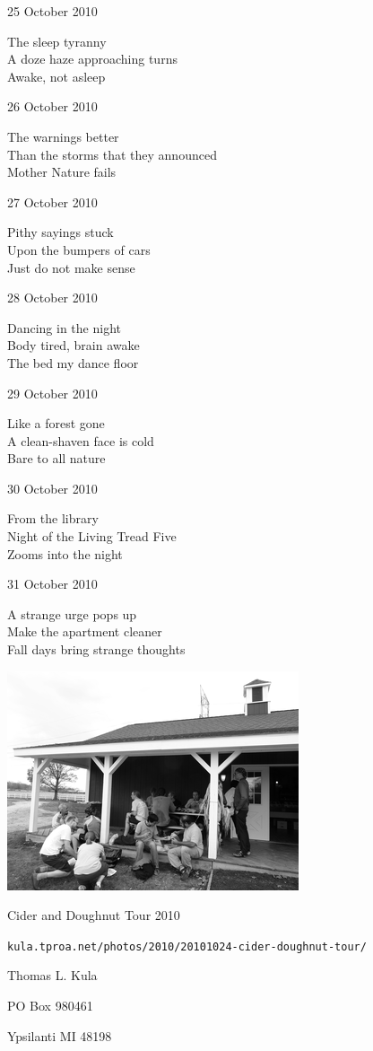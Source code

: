 \documentclass[12pt]{article}
\begin{document}
\newpage

25 October 2010

The sleep tyranny \\
A doze haze approaching turns \\
Awake, not asleep

26 October 2010

The warnings better \\
Than the storms that they announced \\
Mother Nature fails

27 October 2010

Pithy sayings stuck \\
Upon the bumpers of cars \\
Just do not make sense

28 October 2010

Dancing in the night \\
Body tired, brain awake \\
The bed my dance floor

29 October 2010

Like a forest gone \\
A clean-shaven face is cold \\
Bare to all nature

30 October 2010

From the library \\
Night of the Living Tread Five \\
Zooms into the night

31 October 2010

A strange urge pops up \\
Make the apartment cleaner \\
Fall days bring strange thoughts


\newpage

\begin{center}
\includegraphics{cider-and-doughnuts.png} 

Cider and Doughnut Tour 2010

\small{{\tt kula.tproa.net/photos/2010/20101024-cider-doughnut-tour/ }}
\end{center}


\newpage

\thispagestyle{empty}
\vspace*{14cm}
\begin{sideways}
\Large{Thomas L. Kula}
\end{sideways}
\begin{sideways}
\Large{PO Box 980461}
\end{sideways}
\begin{sideways}
\Large{Ypsilanti MI 48198}
\end{sideways}
\end{document}
